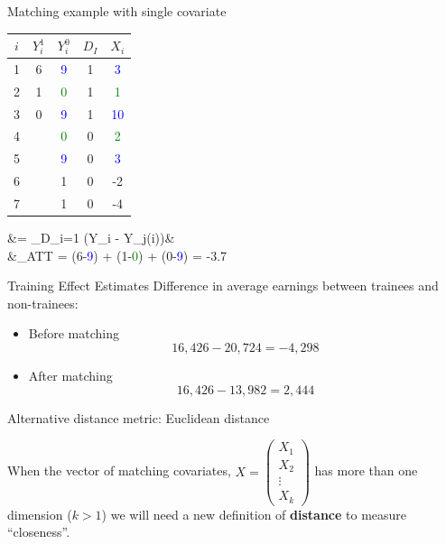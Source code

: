 \documentclass{beamer}
\newcommand*\colvec[1]{\begin{pmatrix}#1\end{pmatrix}}
\begin{document}
	
\begin{frame}{Matching example with single covariate}
	
	\begin{table}
	\begin{tabular}{c|c|c|c|c}
	\hline
	$i$ & $Y^1_i$ & $Y^0_i$ & $D_I$ & $X_i$ \\
	\hline
	1 & 6 &  \textcolor{blue}{9} & 1 & \textcolor{blue}{3} \\
	2 & 1 &  \textcolor{green}{0} & 1 & \textcolor{green}{1} \\
	3 & 0 &   \textcolor{blue}{9} & 1 & \textcolor{blue}{10} \\
	\hline
	4 &  & \textcolor{green}{0} & 0 & \textcolor{green}{2} \\
	5 &  & \textcolor{blue}{9} & 0 & \textcolor{blue}{3} \\
	6 &  & 1 & 0 & -2 \\
	7 &  & 1 & 0 & -4 \\
	\hline
	\end{tabular}
	\end{table}
	
	
	\begin{flalign*}
		&= \sum_{D_i=1} (Y_i - Y_{j(i)})& \\
		&\widehat{\delta}_{ATT} =  \cdot (6-\textcolor{blue}{9}) +  \cdot (1-\textcolor{green}{0}) +  \cdot (0-\textcolor{blue}{9}) = -3.7
	\end{flalign*}

\end{frame}

\begin{frame}{Training Effect Estimates}
  Difference in average earnings between trainees and non-trainees:

  \begin{itemize}
    \item Before matching $$16,426 - 20,724 = -4,298$$
    \item After matching $$16,426 - 13,982 = 2,444$$
  \end{itemize}
  
\end{frame}

{

}


\begin{frame}{Alternative distance metric: Euclidean distance}
	
 When the vector of matching covariates, $X= \colvec{X_1\\X_2\\\vdots\\X_k}$ has more than one dimension ($k>1$) we will need a new definition of \textbf{distance} to measure ``closeness''.  
\end{frame}
\end{document}
